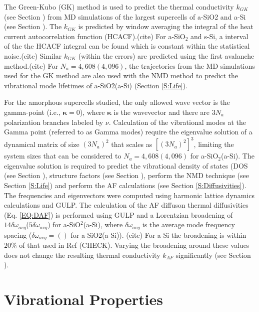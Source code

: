 \documentclass[aps,prb,onecolumn,preprint,superscriptaddress,footinbib,amsmath,amssymb,floatfix]{revtex4}
\begin{document}
The Green-Kubo (GK) method is used to predict the thermal 
conductivity $k_{GK}$ (see Section ) from MD simulations of the 
largest supercells of a-SiO2 and a-Si (see Section ). The 
$k_{GK}$ is predicted by window averaging the integral of the heat current 
autocorrelation function (HCACF).(cite) For a-SiO$_2$ and s-Si, a 
interval of the the HCACF integral can be found which is constant 
within the statistical noise.(cite) Similar $k_{GK}$ (within 
the errors) are predicted using the first avalanche method.(cite)  
For $N_a=4,608 (4,096)$, the trajectories from the MD simulations 
used for the GK method are also used with the NMD method to predict 
the vibrational mode lifetimes of a-SiO2(a-Si) (Section \ref{S:Life}). 

For the amorphous supercells studied,
the only allowed wave vector is the gamma-point (i.e., $\pmb{\kappa}=0$),  
where $\pmb{\kappa}$ is the wavevector and there are $3N_a$ polarization 
branches labeled by $\nu$. 
Calculation of the 
vibrational modes at the Gamma point (referred to as Gamma modes) 
require the eigenvalue solution 
of a dynamical matrix of size 
$(3N_a)^2$ that scales as $[(3N_a)^2]^3$, limiting the system 
sizes that can be considered to $N_a = 4,608(4,096)$ for 
a-SiO$_2$(a-Si). 
The eigenvalue solution is required to predict the vibrational 
density of states (DOS (see Section ), structure factors 
(see Section ), perform the NMD technique  
(see Section \ref{S:Life})  
and perform the AF calculations (see Section \ref{S:Diffusivities}). 
The frequencies and eigenvectors were computed using harmonic
lattice dynamics calculations and GULP.\cite{gale_general_2003} 
The calculation of the AF diffuson thermal diffusivities 
(Eq. \eqref{EQ:DAF}) 
is performed using GULP and a Lorentzian 
broadening of $14\delta\omega_{avg}$($5\delta\omega_{avg}$) for 
a-SiO$^2$(a-Si), where $\delta\omega_{avg}$ is the average mode 
frequency spacing ($\delta\omega_{avg} = ()$ for a-SiO2(a-Si)).
(cite) For a-Si the broadening is within $20\%$ of that used 
in Ref (CHECK). 
Varying the broadening around these values does not 
change the resulting thermal conductivity $k_{AF}$ significantly 
(see Section ). 

\section{\label{S:Vibrational}Vibrational Properties}
\end{document}
